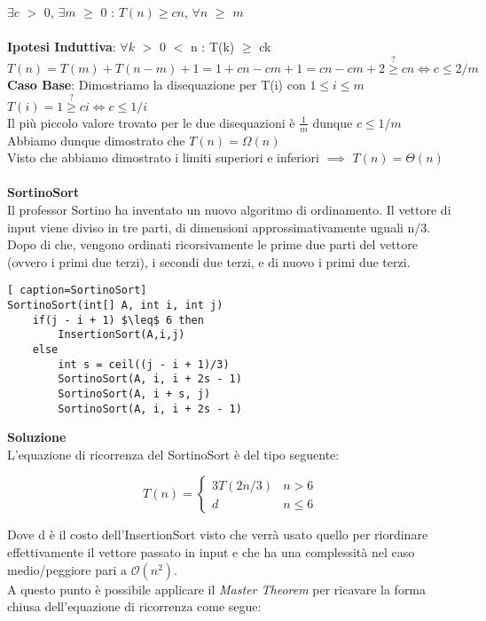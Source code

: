\documentclass[../cheatSheetAlgoritmi.tex]{subfiles}
\begin{document}
$\exists c$ $>$ 0, $\exists m$ $\geq$ 0 : $T(n) \geq cn$, $\forall n$ $\geq$ $m$\\\\
\textbf{Ipotesi Induttiva}: $\forall k$ $>$ 0 $<$ n : T(k) $\geq$ ck\\
$T(n) = T(m) + T(n-m) + 1 = 1 + cn - cm + 1 = cn - cm + 2 \stackrel{?}{\geq} cn \iff c \leq 2/m$\\
\textbf{Caso Base}: Dimostriamo la disequazione per T(i) con $1 \leq i \leq m$\\
$T(i) = 1 \stackrel{?}{\geq} ci \iff c \leq 1/i$\\
Il più piccolo valore trovato per le due disequazioni è $\frac{1}{m}$ dunque $c \leq 1/m$\\
Abbiamo dunque dimostrato che $T(n) = \Omega(n)$\\
Visto che abbiamo dimostrato i limiti superiori e inferiori $\implies$ $T(n) = \Theta(n)$\\\\
\textbf{SortinoSort}\\
Il professor Sortino ha inventato un nuovo algoritmo di ordinamento. Il vettore di input viene diviso in tre parti, di dimensioni approssimativamente uguali n/3. Dopo di che, vengono ordinati ricorsivamente le prime due parti del vettore (ovvero i primi due terzi), i secondi due terzi, e di nuovo i primi due terzi.
\begin{lstlisting}[ caption=SortinoSort]
SortinoSort(int[] A, int i, int j)
	if(j - i + 1) $\leq$ 6 then
		InsertionSort(A,i,j)
	else
		int s = ceil((j - i + 1)/3)
		SortinoSort(A, i, i + 2s - 1)
		SortinoSort(A, i + s, j)
		SortinoSort(A, i, i + 2s - 1)
\end{lstlisting}
\textbf{Soluzione}\\
L'equazione di ricorrenza del SortinoSort è del tipo seguente:
\begin{center}
	\begin{equation*}
  		T(n)=\begin{cases}
			3T(2n/3) & \text{$n > 6$}\\
			d & \text{$n \leq 6$}	
  		\end{cases}
	\end{equation*}
\end{center}
Dove d è il costo dell'InsertionSort visto che verrà usato quello per riordinare effettivamente il vettore passato in input e che ha una complessità nel caso medio/peggiore pari a $\mathcal{O}(n^{2})$.\\
A questo punto è possibile applicare il \textit{Master Theorem} per ricavare la forma chiusa dell'equazione di ricorrenza come segue: \\
\end{document}

